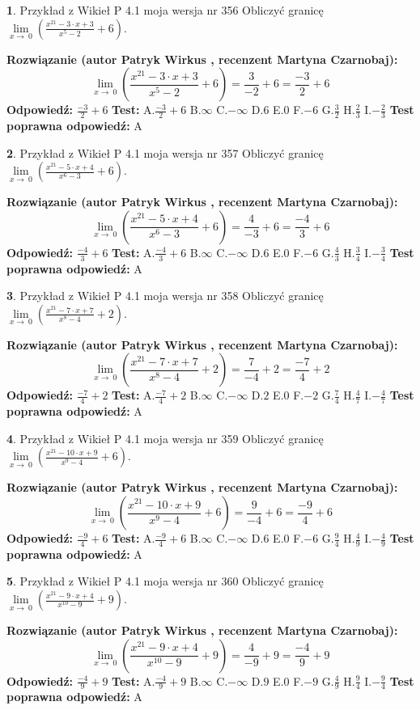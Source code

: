 \documentclass[12pt, a4paper]{article}
\theoremstyle{definition} %
\newtheorem{zad}{}
\newcommand{\zadStart}[1]{\begin{zad}#1\newline}
\newcommand{\zadStop}{\end{zad}}
\newcommand{\rozwStart}[2]{\noindent \textbf{Rozwiązanie (autor #1 , recenzent #2): }\newline}
\newcommand{\rozwStop}{\newline}
\newcommand{\odpStart}{\noindent \textbf{Odpowiedź:}\newline}
\newcommand{\odpStop}{\newline}
\newcommand{\testStart}{\noindent \textbf{Test:}\newline}
\newcommand{\testStop}{\newline}
\newcommand{\kluczStart}{\noindent \textbf{Test poprawna odpowiedź:}\newline}
\newcommand{\kluczStop}{\newline}
\begin{document}
\zadStart{Przykład z Wikieł P 4.1 moja wersja nr 356}
Obliczyć granicę $\lim\limits_{x\to\ 0}(\frac{x^{21}-3 \cdot x +3}{x^{5}-2}+6)$.
\zadStop
\rozwStart{Patryk Wirkus}{Martyna Czarnobaj}
$$\lim\limits_{x\to\ 0}(\frac{x^{21}-3 \cdot x +3}{x^{5}-2}+6)=\frac{3}{-2}+6=\frac{-3}{2}+6$$
\rozwStop
\odpStart
$\frac{-3}{2}+6$
\odpStop
\testStart
A.$\frac{-3}{2}+6$
B.$\infty$
C.$-\infty$
D.$6$
E.$0$
F.$-6$
G.$\frac{3}{2}$
H.$\frac{2}{3}$
I.$-\frac{2}{3}$
\testStop
\kluczStart
A
\kluczStop



\zadStart{Przykład z Wikieł P 4.1 moja wersja nr 357}
Obliczyć granicę $\lim\limits_{x\to\ 0}(\frac{x^{21}-5 \cdot x +4}{x^{6}-3}+6)$.
\zadStop
\rozwStart{Patryk Wirkus}{Martyna Czarnobaj}
$$\lim\limits_{x\to\ 0}(\frac{x^{21}-5 \cdot x +4}{x^{6}-3}+6)=\frac{4}{-3}+6=\frac{-4}{3}+6$$
\rozwStop
\odpStart
$\frac{-4}{3}+6$
\odpStop
\testStart
A.$\frac{-4}{3}+6$
B.$\infty$
C.$-\infty$
D.$6$
E.$0$
F.$-6$
G.$\frac{4}{3}$
H.$\frac{3}{4}$
I.$-\frac{3}{4}$
\testStop
\kluczStart
A
\kluczStop



\zadStart{Przykład z Wikieł P 4.1 moja wersja nr 358}
Obliczyć granicę $\lim\limits_{x\to\ 0}(\frac{x^{21}-7 \cdot x +7}{x^{8}-4}+2)$.
\zadStop
\rozwStart{Patryk Wirkus}{Martyna Czarnobaj}
$$\lim\limits_{x\to\ 0}(\frac{x^{21}-7 \cdot x +7}{x^{8}-4}+2)=\frac{7}{-4}+2=\frac{-7}{4}+2$$
\rozwStop
\odpStart
$\frac{-7}{4}+2$
\odpStop
\testStart
A.$\frac{-7}{4}+2$
B.$\infty$
C.$-\infty$
D.$2$
E.$0$
F.$-2$
G.$\frac{7}{4}$
H.$\frac{4}{7}$
I.$-\frac{4}{7}$
\testStop
\kluczStart
A
\kluczStop



\zadStart{Przykład z Wikieł P 4.1 moja wersja nr 359}
Obliczyć granicę $\lim\limits_{x\to\ 0}(\frac{x^{21}-10 \cdot x +9}{x^{9}-4}+6)$.
\zadStop
\rozwStart{Patryk Wirkus}{Martyna Czarnobaj}
$$\lim\limits_{x\to\ 0}(\frac{x^{21}-10 \cdot x +9}{x^{9}-4}+6)=\frac{9}{-4}+6=\frac{-9}{4}+6$$
\rozwStop
\odpStart
$\frac{-9}{4}+6$
\odpStop
\testStart
A.$\frac{-9}{4}+6$
B.$\infty$
C.$-\infty$
D.$6$
E.$0$
F.$-6$
G.$\frac{9}{4}$
H.$\frac{4}{9}$
I.$-\frac{4}{9}$
\testStop
\kluczStart
A
\kluczStop



\zadStart{Przykład z Wikieł P 4.1 moja wersja nr 360}
Obliczyć granicę $\lim\limits_{x\to\ 0}(\frac{x^{21}-9 \cdot x +4}{x^{10}-9}+9)$.
\zadStop
\rozwStart{Patryk Wirkus}{Martyna Czarnobaj}
$$\lim\limits_{x\to\ 0}(\frac{x^{21}-9 \cdot x +4}{x^{10}-9}+9)=\frac{4}{-9}+9=\frac{-4}{9}+9$$
\rozwStop
\odpStart
$\frac{-4}{9}+9$
\odpStop
\testStart
A.$\frac{-4}{9}+9$
B.$\infty$
C.$-\infty$
D.$9$
E.$0$
F.$-9$
G.$\frac{4}{9}$
H.$\frac{9}{4}$
I.$-\frac{9}{4}$
\testStop
\kluczStart
A
\kluczStop
\end{document}
